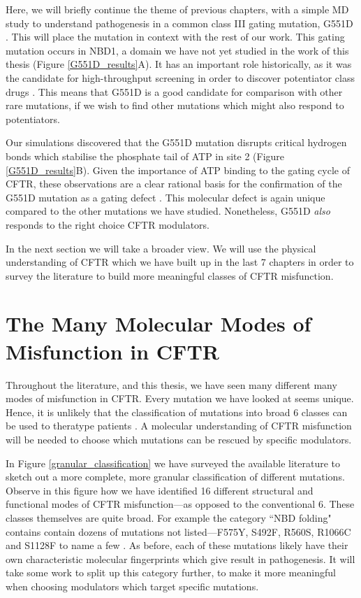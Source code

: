 Here, we will briefly continue the theme of previous chapters, with a simple MD study to understand pathogenesis in a common class III gating mutation, G551D \cite{li1996}. This will place the mutation in context with the rest of our work. This gating mutation occurs in NBD1, a domain we have not yet studied in the work of this thesis (Figure \ref{G551D_results}A). It has an important role historically, as it was the candidate for high-throughput screening in order to discover potentiator class drugs \cite{vangoor2009}. This means that G551D is a good candidate for comparison with other rare mutations, if we wish to find other mutations which might also respond to potentiators.

Our simulations discovered that the G551D mutation disrupts critical hydrogen bonds which stabilise the phosphate tail of ATP in site 2 (Figure \ref{G551D_results}B). Given the importance of ATP binding to the gating cycle of CFTR, these observations are a clear rational basis for the confirmation of the G551D mutation as a gating defect \cite{bompadre2008}. This molecular defect is again unique compared to the other mutations we have studied. Nonetheless, G551D \textit{also} responds to the right choice CFTR modulators. 

In the next section we will take a broader view. We will use the physical understanding of CFTR which we have built up in the last 7 chapters in order to survey the literature to build more meaningful classes of CFTR misfunction.

\section{The Many Molecular Modes of Misfunction in CFTR}

Throughout the literature, and this thesis, we have seen many different many modes of  misfunction in CFTR. Every mutation we have looked at seems unique. Hence, it is unlikely that the classification of mutations into broad 6 classes can be used to theratype patients \cite{veit2016}. A molecular understanding of CFTR misfunction will be needed to choose which mutations can be rescued by specific modulators. 

In Figure \ref{granular_classification} we have surveyed the available literature to sketch out a more complete, more granular classification of different mutations. Observe in this figure how we have identified 16 different structural and functional modes of CFTR misfunction---as opposed to the conventional 6. These classes themselves are quite broad. For example the category ``NBD folding" contains contain dozens of mutations not listed---F575Y, S492F, R560S, R1066C and S1128F to name a few \cite{awatade2019, lopes-pacheco2016, casals1997, cotten1996, penmatsa2009}. As before, each of these mutations likely have their own characteristic molecular fingerprints which give result in pathogenesis. It will take some work to split up this category further, to make it more meaningful when choosing modulators which target specific mutations.

